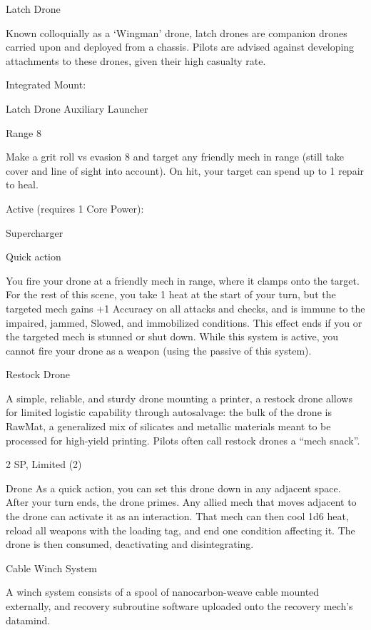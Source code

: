                                                       Latch Drone  

  Known colloquially as a ‘Wingman’ drone, latch drones are companion drones carried upon and  
  deployed from a chassis. Pilots are advised against developing attachments to these drones, given their  
  high casualty rate.
 

   Integrated Mount:
 
  Latch Drone  
  Auxiliary Launcher
 
   Range 8
 
   Make a grit roll vs evasion 8 and target any friendly mech in range (still take cover and line of sight into  
   account). On hit, your target can spend up to 1 repair to heal.
 

  Active (requires 1 Core Power):
 
   Supercharger
 
   Quick action
 
  You fire your drone at a friendly mech in range, where it clamps onto the target. For the rest of this  
   scene, you take 1 heat at the start of your turn, but the targeted mech gains +1 Accuracy on all attacks  
   and checks, and is immune to the impaired, jammed, Slowed, and immobilized conditions. This effect  
   ends if you or the targeted mech is stunned or shut down. While this system is active, you cannot fire  
  your drone as a weapon (using the passive of this system). 

Restock Drone   

A simple, reliable, and sturdy drone mounting a printer, a restock drone allows for limited logistic capability  
through autosalvage: the bulk of the drone is RawMat, a generalized mix of silicates and metallic materials  
meant to be processed for high-yield printing. Pilots often call restock drones a “mech snack”.    

2 SP, Limited (2)  

Drone  
As a quick action, you can set this drone down in any adjacent space. After your turn ends, the  
drone primes. Any allied mech that moves adjacent to the drone can activate it as an interaction.  
That mech can then cool 1d6 heat, reload all weapons with the loading tag, and end one  
condition affecting it. The drone is then consumed, deactivating and disintegrating.
 

Cable Winch System   

A winch system consists of a spool of nanocarbon-weave cable mounted externally, and recovery  
subroutine software uploaded onto the recovery mech’s datamind.   


